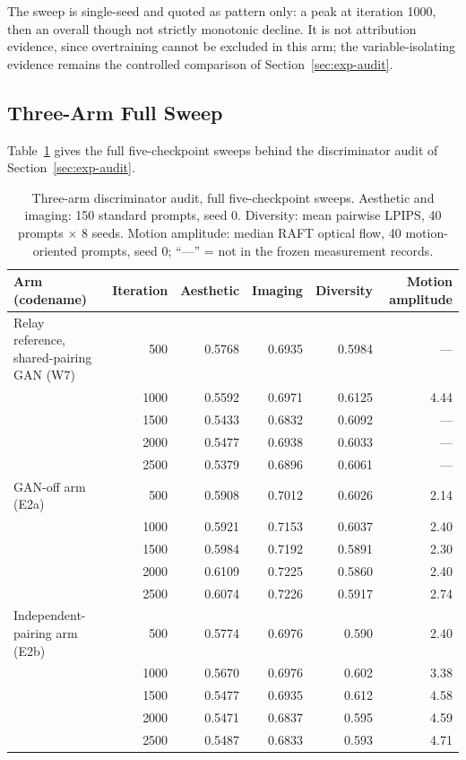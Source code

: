 \documentclass[11pt,a4paper]{article}
\begin{document}
The sweep is single-seed and quoted as pattern only: a peak at iteration 1000, then an overall though not strictly monotonic decline. It is not attribution evidence, since overtraining cannot be excluded in this arm; the variable-isolating evidence remains the controlled comparison of Section~\ref{sec:exp-audit}.

\subsection{Three-Arm Full Sweep}\label{sec:app-threearm}

Table~\ref{tab:threearm} gives the full five-checkpoint sweeps behind the discriminator audit of Section~\ref{sec:exp-audit}.

\begin{table}[htbp]
  \centering
  \footnotesize
  \setlength{\tabcolsep}{4pt}
  \begin{tabular}{lrrrrr}
    \toprule
    Arm (codename) & Iteration & Aesthetic & Imaging & Diversity & Motion amplitude \\
    \midrule
    Relay reference, shared-pairing GAN (W7) & 500 & 0.5768 & 0.6935 & 0.5984 & — \\
     & 1000 & 0.5592 & 0.6971 & 0.6125 & 4.44 \\
     & 1500 & 0.5433 & 0.6832 & 0.6092 & — \\
     & 2000 & 0.5477 & 0.6938 & 0.6033 & — \\
     & 2500 & 0.5379 & 0.6896 & 0.6061 & — \\
    \addlinespace
    GAN-off arm (E2a) & 500 & 0.5908 & 0.7012 & 0.6026 & 2.14 \\
     & 1000 & 0.5921 & 0.7153 & 0.6037 & 2.40 \\
     & 1500 & 0.5984 & 0.7192 & 0.5891 & 2.30 \\
     & 2000 & 0.6109 & 0.7225 & 0.5860 & 2.40 \\
     & 2500 & 0.6074 & 0.7226 & 0.5917 & 2.74 \\
    \addlinespace
    Independent-pairing arm (E2b) & 500 & 0.5774 & 0.6976 & 0.590 & 2.40 \\
     & 1000 & 0.5670 & 0.6976 & 0.602 & 3.38 \\
     & 1500 & 0.5477 & 0.6935 & 0.612 & 4.58 \\
     & 2000 & 0.5471 & 0.6837 & 0.595 & 4.59 \\
     & 2500 & 0.5487 & 0.6833 & 0.593 & 4.71 \\
    \bottomrule
  \end{tabular}
  \caption{Three-arm discriminator audit, full five-checkpoint sweeps. Aesthetic and imaging: 150 standard prompts, seed 0. Diversity: mean pairwise LPIPS, 40 prompts $\times$ 8 seeds. Motion amplitude: median RAFT optical flow, 40 motion-oriented prompts, seed 0; ``—'' = not in the frozen measurement records.}
  \label{tab:threearm}
\end{table}

\clearpage

\end{document}
